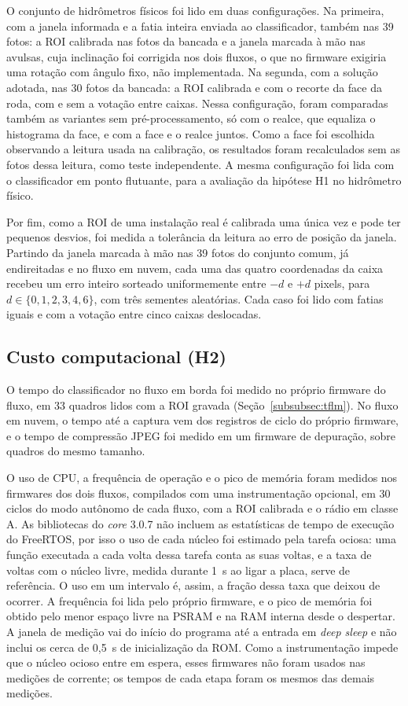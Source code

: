 O conjunto de hidrômetros físicos foi lido em duas configurações. Na primeira, com a
janela informada e a fatia
inteira enviada ao classificador, também nas 39 fotos: a ROI calibrada nas fotos da
bancada e a janela marcada à mão nas avulsas, cuja inclinação foi corrigida nos dois
fluxos, o que no firmware exigiria uma rotação com ângulo fixo, não implementada. Na
segunda, com a solução adotada, nas 30 fotos da bancada: a ROI calibrada e com o recorte da face da roda, com e sem a votação entre caixas. Nessa
configuração, foram comparadas também as variantes sem pré-processamento, só com o realce,
que equaliza o histograma da face, e com a face e o realce juntos. Como a face foi escolhida
observando a leitura usada na calibração, os resultados foram recalculados sem as fotos
dessa leitura, como teste independente. A mesma configuração foi lida com o classificador
em ponto flutuante, para a avaliação da hipótese H1 no hidrômetro físico.

Por fim, como a ROI de uma instalação real é calibrada uma única vez e pode ter pequenos
desvios, foi medida a tolerância da leitura ao erro de posição da janela. Partindo da janela
marcada à mão nas 39 fotos do conjunto comum, já endireitadas e no fluxo em nuvem, cada uma
das quatro coordenadas da caixa recebeu um erro inteiro sorteado uniformemente entre $-d$ e
$+d$ pixels, para $d \in \{0, 1, 2, 3, 4, 6\}$, com três sementes aleatórias. Cada caso foi
lido com fatias iguais e com a votação entre cinco caixas deslocadas.

\subsection{Custo computacional (H2)}
\label{subsec:exp_custo}

O tempo do classificador no fluxo em borda foi medido no próprio firmware do fluxo, em 33
quadros lidos com a ROI gravada (Seção~\ref{subsubsec:tflm}). No fluxo em nuvem, o tempo até a captura vem
dos registros de ciclo do próprio firmware, e o tempo de compressão JPEG foi medido em
um firmware de depuração, sobre quadros do mesmo tamanho.

O uso de CPU, a frequência de operação e o pico de memória foram medidos nos firmwares
dos dois fluxos, compilados com uma instrumentação opcional, em 30 ciclos do modo autônomo
de cada fluxo, com a ROI calibrada e o rádio em classe A. As bibliotecas do \textit{core}
3.0.7 não incluem as estatísticas de tempo de execução do FreeRTOS, por isso o uso de cada
núcleo foi estimado pela tarefa ociosa: uma função executada a cada volta dessa tarefa
conta as suas voltas, e a taxa de voltas com o núcleo livre, medida durante 1~s ao ligar a
placa, serve de referência. O uso em um intervalo é, assim, a fração dessa taxa que deixou
de ocorrer. A frequência foi lida pelo próprio firmware, e o pico de memória foi obtido
pelo menor espaço livre na PSRAM e na RAM interna desde o despertar. A janela de medição
vai do início do programa até a entrada em \textit{deep sleep} e não inclui os cerca de
0,5~s de inicialização da ROM. Como a instrumentação impede que o núcleo ocioso entre em
espera, esses firmwares não foram usados nas medições de corrente; os tempos de cada etapa
foram os mesmos das demais medições.

